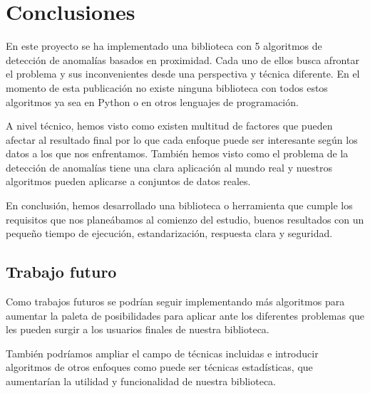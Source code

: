 \chapter{Conclusiones} 

En este proyecto se ha implementado una biblioteca con 5 algoritmos 
de detección de anomalías basados en proximidad. Cada uno de ellos  
busca afrontar el problema y sus inconvenientes desde una perspectiva 
y técnica diferente. En el momento de esta publicación no existe  
ninguna biblioteca con todos estos algoritmos ya sea en Python o  
en otros lenguajes de programación. 
 

A nivel técnico, hemos visto como existen multitud de factores que  
pueden afectar al resultado final por lo que cada enfoque puede ser 
interesante según los datos a los que nos enfrentamos. También hemos 
visto como el problema de la detección de anomalías tiene una clara  
aplicación al mundo real y nuestros algoritmos pueden aplicarse a  
conjuntos de datos reales. 
 

En conclusión, hemos desarrollado una biblioteca o herramienta que cumple 
los requisitos que nos planeábamos al comienzo del estudio, buenos resultados 
con un pequeño tiempo de ejecución, estandarización, respuesta clara y seguridad.  
 
\section{Trabajo futuro} 
Como trabajos futuros se podrían seguir implementando más algoritmos 
para aumentar la paleta de posibilidades para aplicar ante los diferentes 
problemas que les pueden surgir a los usuarios finales de nuestra biblioteca. 

También podríamos ampliar el campo de técnicas incluidas e introducir  
algoritmos de otros enfoques como puede ser técnicas estadísticas, que  
aumentarían la utilidad y funcionalidad de nuestra biblioteca.



